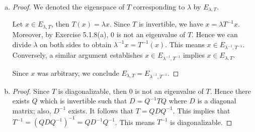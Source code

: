 \begin{Exercise}
	\begin{enumerate}[(a)]
		\item
		\begin{proof}
			We denoted the eigenspace of $T$ corresponding to $\lambda$ by $E_{\lambda,T}$.
			
			Let $x\in E_{\lambda, T}$, then $T(x) = \lambda x$. Since $T$ is invertible, we have $x = \lambda T^{-1} x$. Moreover, by Exercise 5.1.8(a), $0$ is not an eigenvalue of $T$. Hence we can divide $\lambda$ on both sides to obtain $\lambda^{-1} x = T^{-1}(x)$. This means $x\in E_{\lambda^{-1},T^{-1}}$. Conversely, a similar argument establishes $x\in E_{\lambda^{-1},T^{-1}}$ implies $x\in E_{\lambda, T}$.
			
			Since $x$ was arbitrary, we conclude $ E_{\lambda, T} = E_{\lambda^{-1},T^{-1}}$.
		\end{proof}
		
		\item
		\begin{proof}
			Since $T$ is diagonalizable, then $0$ is not an eigenvalue of $T$. Hence there exists $Q$ which is invertible such that $D = Q^{-1} T Q$ where $D$ is a diagonal matrix; also, $D^{-1}$ exists. It follows that $T = Q D Q^{-1}$. This implies that $T^{-1} = (Q D Q^{-1})^{-1} = Q D^{-1} Q^{-1}$. This means $T^{-1}$ is diagonalizable.
		\end{proof}
	\end{enumerate}
\end{Exercise}